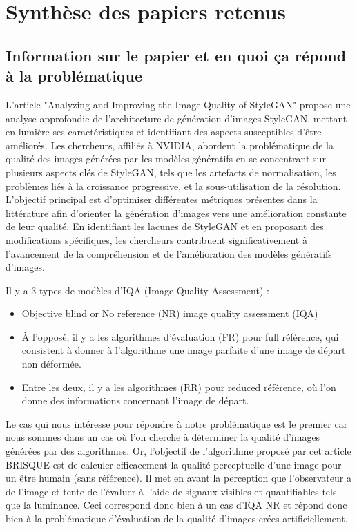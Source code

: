 \documentclass{ieeeaccess}
\begin{document}
\section{Synthèse des papiers retenus}

\subsection{Information sur le papier et en quoi ça répond à la problématique}

 L'article "Analyzing and Improving the Image Quality of StyleGAN" propose une analyse approfondie de l'architecture de génération d'images StyleGAN, mettant en lumière ses caractéristiques et identifiant des aspects susceptibles d'être améliorés. Les chercheurs, affiliés à NVIDIA, abordent la problématique de la qualité des images générées par les modèles génératifs en se concentrant sur plusieurs aspects clés de StyleGAN, tels que les artefacts de normalisation, les problèmes liés à la croissance progressive, et la sous-utilisation de la résolution. L'objectif principal est d'optimiser différentes métriques présentes dans la littérature afin d'orienter la génération d'images vers une amélioration constante de leur qualité. En identifiant les lacunes de StyleGAN et en proposant des modifications spécifiques, les chercheurs contribuent significativement à l'avancement de la compréhension et de l'amélioration des modèles génératifs d'images.

 Il y a 3 types de modèles d’IQA (Image Quality Assessment) :
\begin{itemize}
    \item Objective blind or No reference (NR) image quality assessment (IQA)
    \item À l'opposé, il y a les algorithmes d'évaluation (FR) pour full référence, qui consistent à donner à l'algorithme une image parfaite d'une image de départ non déformée.
    \item Entre les deux, il y a les algorithmes (RR) pour reduced référence, où l'on donne des informations concernant l'image de départ.
\end{itemize}

Le cas qui nous intéresse pour répondre à notre problématique est le premier car nous sommes dans un cas où l’on cherche à déterminer la qualité d’images générées par des algorithmes. Or, l’objectif de l’algorithme proposé par cet article BRISQUE est de calculer efficacement la qualité perceptuelle d’une image pour un être humain (sans référence). Il met en avant la perception que l’observateur a de l’image et tente de l’évaluer à l’aide de signaux visibles et quantifiables tels que la luminance. Ceci correspond donc bien à un cas d’IQA NR et répond donc bien à la problématique d’évaluation de la qualité d’images crées artificiellement. 
\end{document}
